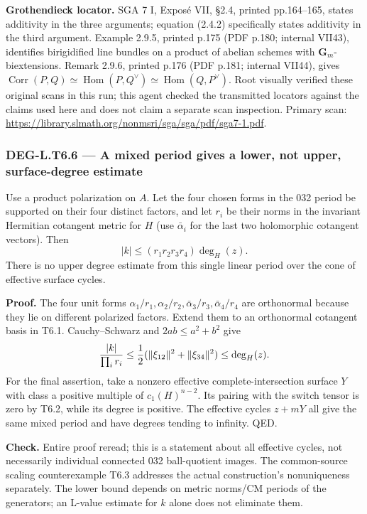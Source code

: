 \textbf{Grothendieck locator.} SGA 7 I, Exposé VII, §2.4, printed pp.164--165, states additivity in the three arguments; equation (2.4.2) specifically states additivity in the third argument. Example 2.9.5, printed p.175 (PDF p.180; internal VII43), identifies birigidified line bundles on a product of abelian schemes with \(\mathbf G_m\)-biextensions. Remark 2.9.6, printed p.176 (PDF p.181; internal VII44), gives \(\operatorname{Corr}(P,Q)\simeq\operatorname{Hom}(P,Q^\vee)\simeq\operatorname{Hom}(Q,P^\vee)\). Root visually verified these original scans in this run; this agent checked the transmitted locators against the claims used here and does not claim a separate scan inspection. Primary scan: \url{https://library.slmath.org/nonmsri/sga/sga/pdf/sga7-1.pdf}.

\subsubsection{DEG-L.T6.6 --- A mixed period gives a lower, not upper, surface-degree estimate}\label{DEG-L.T6.6}

Use a product polarization on \(A\). Let the four chosen forms in the 032 period be supported on their four distinct factors, and let \(r_i\) be their norms in the invariant Hermitian cotangent metric for \(H\) (use \(\bar\alpha_i\) for the last two holomorphic cotangent vectors). Then \[
|k|\le (r_1r_2r_3r_4)\deg_H(z).
\tag{G5}
\] There is no upper degree estimate from this single linear period over the cone of effective surface cycles.

\textbf{Proof.} The four unit forms \(\alpha_1/r_1,\alpha_2/r_2,\bar\alpha_3/r_3,\bar\alpha_4/r_4\) are orthonormal because they lie on different polarized factors. Extend them to an orthonormal cotangent basis in T6.1. Cauchy--Schwarz and \(2ab\le a^2+b^2\) give \[
{|k|\over\prod_i r_i}\le {1\over2}(\|\xi_{12}\|^2+\|\xi_{34}\|^2)
\le\deg_H(z).
\] For the final assertion, take a nonzero effective complete-intersection surface \(Y\) with class a positive multiple of \(c_1(H)^{n-2}\). Its pairing with the switch tensor is zero by T6.2, while its degree is positive. The effective cycles \(z+mY\) all give the same mixed period and have degrees tending to infinity. QED.

\textbf{Check.} Entire proof reread; this is a statement about all effective cycles, not necessarily individual connected 032 ball-quotient images. The common-source scaling counterexample T6.3 addresses the actual construction's nonuniqueness separately. The lower bound depends on metric norms/CM periods of the generators; an L-value estimate for \(k\) alone does not eliminate them.


